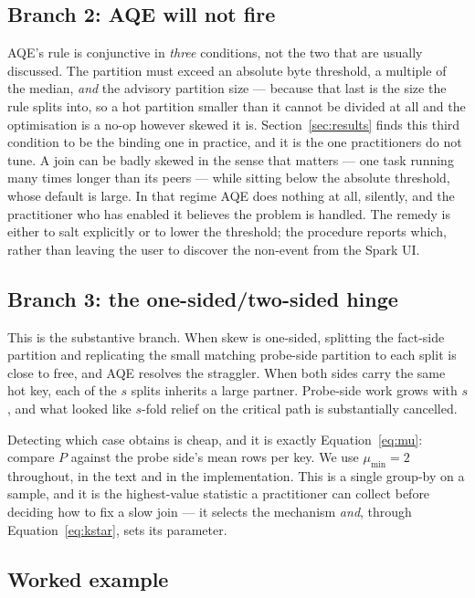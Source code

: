 \subsection{Branch 2: AQE will not fire}
AQE's rule is conjunctive in \emph{three} conditions, not the two that are
usually discussed. The partition must exceed an absolute byte threshold, a
multiple of the median, \emph{and} the advisory partition size --- because that
last is the size the rule splits into, so a hot partition smaller than it
cannot be divided at all and the optimisation is a no-op however skewed it is.
Section~\ref{sec:results} finds this third condition to be the binding one in
practice, and it is the one practitioners do not tune. A join can be badly skewed in the sense
that matters --- one task running many times longer than its peers --- while
sitting below the absolute threshold, whose default is large. In that regime
AQE does nothing at all, silently, and the practitioner who has enabled it
believes the problem is handled. The remedy is either to salt explicitly or to
lower the threshold; the procedure reports which, rather than leaving the user
to discover the non-event from the Spark UI.

\subsection{Branch 3: the one-sided/two-sided hinge}
This is the substantive branch. When skew is one-sided, splitting the fact-side
partition and replicating the small matching probe-side partition to each split
is close to free, and AQE resolves the straggler. When both sides carry the
same hot key, each of the $s$ splits inherits a large partner. Probe-side work
grows with $s$, and what looked like $s$-fold relief on the critical path is
substantially cancelled.

Detecting which case obtains is cheap, and it is exactly
Equation~\eqref{eq:mu}: compare $P$ against the probe side's mean rows per key.
We use $\mu_{\min}=2$ throughout, in the
text and in the implementation. This is a single group-by on a sample, and it is the
highest-value statistic a practitioner can collect before deciding how to fix a
slow join --- it selects the mechanism \emph{and}, through
Equation~\eqref{eq:kstar}, sets its parameter.

\subsection{Worked example}

